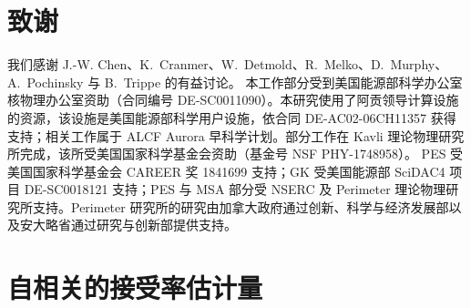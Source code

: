 
\section*{致谢}

我们感谢 J.-W. Chen、K.~Cranmer、W.~Detmold、R.~Melko、D.~Murphy、A.~Pochinsky 与 B.~Trippe 的有益讨论。
%
本工作部分受到美国能源部科学办公室核物理办公室资助（合同编号 DE-SC0011090）。本研究使用了阿贡领导计算设施的资源，该设施是美国能源部科学用户设施，依合同 DE-AC02-06CH11357 获得支持；相关工作属于 ALCF Aurora 早科学计划。部分工作在 Kavli 理论物理研究所完成，该所受美国国家科学基金会资助（基金号 NSF PHY-1748958）。
PES 受美国国家科学基金会 CAREER 奖 1841699 支持；GK 受美国能源部 SciDAC4 项目 DE-SC0018121 支持；PES 与 MSA 部分受 NSERC 及 Perimeter 理论物理研究所支持。Perimeter 研究所的研究由加拿大政府通过创新、科学与经济发展部以及安大略省通过研究与创新部提供支持。


\appendix

\section{自相关的接受率估计量}
\label{app:bounds}


